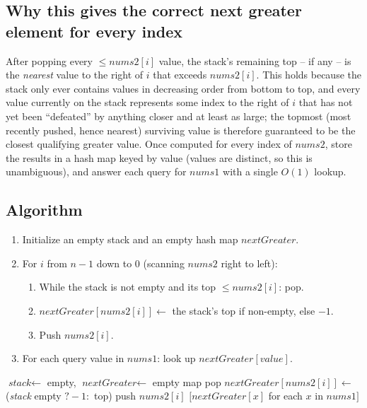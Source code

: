 \subsection*{Why this gives the correct next greater element for every index}

After popping every $\le \textit{nums2}[i]$ value, the stack's remaining
top -- if any -- is the \emph{nearest} value to the right of $i$ that
exceeds $\textit{nums2}[i]$. This holds because the stack only ever
contains values in decreasing order from bottom to top, and every value
currently on the stack represents some index to the right of $i$ that has
not yet been ``defeated'' by anything closer and at least as large; the
topmost (most recently pushed, hence nearest) surviving value is therefore
guaranteed to be the closest qualifying greater value. Once computed for
every index of $\textit{nums2}$, store the results in a hash map keyed by
value (values are distinct, so this is unambiguous), and answer each
query for $\textit{nums1}$ with a single $O(1)$ lookup.

\subsection*{Algorithm}

\begin{enumerate}
  \item Initialize an empty stack and an empty hash map
        $\textit{nextGreater}$.
  \item For $i$ from $n-1$ down to $0$ (scanning $\textit{nums2}$ right
        to left):
  \begin{enumerate}
    \item While the stack is not empty and its top $\le
          \textit{nums2}[i]$: pop.
    \item $\textit{nextGreater}[\textit{nums2}[i]] \gets$ the stack's top
          if non-empty, else $-1$.
    \item Push $\textit{nums2}[i]$.
  \end{enumerate}
  \item For each query value in $\textit{nums1}$: look up
        $\textit{nextGreater}[\textit{value}]$.
\end{enumerate}

\begin{algorithm}[H]
\caption{Next Greater Element I}
\begin{algorithmic}[1]
  \State $\textit{stack} \gets$ empty, $\textit{nextGreater} \gets$ empty map
      \State pop
    \EndWhile
    \State $\textit{nextGreater}[\textit{nums2}[i]] \gets$ (\textit{stack} empty $? -1 :$ top)
    \State push $\textit{nums2}[i]$
  \EndFor
  \State \Return $[\textit{nextGreater}[x]$ for each $x$ in $\textit{nums1}]$
\EndProcedure
\end{algorithmic}
\end{algorithm}

